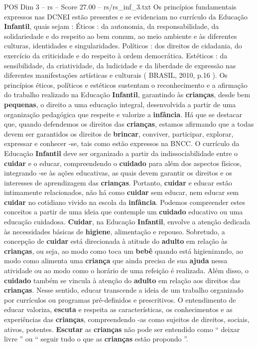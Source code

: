 \begin{textsample}{POS Dim 3 – rs – Score 27.00 – rs/rs\_inf\_3.txt}
Os princípios fundamentais expressos nas DCNEI estão presentes e se evidenciam no currículo da Educação \textbf{Infantil}, quais sejam : Éticos : da autonomia, da responsabilidade, da solidariedade e do respeito ao bem comum, ao meio ambiente e às diferentes culturas, identidades e singularidades.
Políticos : dos direitos de cidadania, do exercício da criticidade e do respeito à ordem democrática.
Estéticos : da sensibilidade, da criatividade, da ludicidade e da liberdade de expressão nas diferentes manifestações artísticas e culturais ( BRASIL, 2010, p.16 ).
Os princípios éticos, políticos e estéticos sustentam o reconhecimento e a afirmação do trabalho realizado na Educação \textbf{Infantil}, garantindo às \textbf{crianças}, desde bem \textbf{pequenas}, o direito a uma educação integral, desenvolvida a partir de uma organização pedagógica que respeite e valorize a \textbf{infância}.
Há que se destacar que, quando defendemos os direitos das \textbf{crianças}, estamos afirmando que a todas devem ser garantidos os direitos de \textbf{brincar}, conviver, participar, explorar, expressar e conhecer -se, tais como estão expressos na BNCC.
O currículo da Educação \textbf{Infantil} deve ser organizado a partir da indissociabilidade entre o \textbf{cuidar} e o educar, compreendendo o \textbf{cuidado} para além dos aspectos físicos, integrando -se às ações educativas, as quais devem garantir os direitos e os interesses de aprendizagem das \textbf{crianças}.
Portanto, \textbf{cuidar} e educar estão intimamente relacionados, não há como \textbf{cuidar} sem educar, nem educar sem \textbf{cuidar} no cotidiano vivido na escola da \textbf{infância}.
Podemos compreender estes conceitos a partir de uma ideia que contemple um \textbf{cuidado} educativo ou uma educação cuidadosa. \textbf{Cuidar}, na Educação \textbf{Infantil}, envolve a atenção dedicada às necessidades básicas de \textbf{higiene}, alimentação e repouso.
Sobretudo, a concepção de \textbf{cuidar} está direcionada à atitude do \textbf{adulto} em relação às \textbf{crianças}, ou seja, ao modo como toca um \textbf{bebê} quando está higienizando, ao modo como alimenta uma \textbf{criança} que ainda precisa de sua \textbf{ajuda} nessa atividade ou ao modo como o horário de uma refeição é realizada.
Além disso, o \textbf{cuidado} também se vincula à atenção do \textbf{adulto} em relação aos direitos das \textbf{crianças}.
Nesse sentido, educar transcende a ideia de um trabalho organizado por currículos ou programas pré-definidos e prescritivos.
O entendimento de educar valoriza, \textbf{escuta} e respeita as características, os conhecimentos e as experiências das \textbf{crianças}, compreendendo -as como sujeitos de direitos, sociais, ativos, potentes. \textbf{Escutar} as \textbf{crianças} não pode ser entendido como “ deixar livre ” ou “ seguir tudo o que as \textbf{crianças} estão propondo ”.

\end{textsample}
